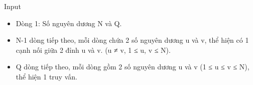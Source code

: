 Input
\begin{itemize}
	\item      Dòng 1: Số nguyên dương N và Q.    
	\item      N-1 dòng tiếp theo, mỗi dòng chứa 2 số nguyên dương u và v, thể hiện có 1 cạnh nối giữa 2 đỉnh u và v. (u ≠ v, 1 ≤ u, v ≤ N).    
	\item      Q dòng tiếp theo, mỗi dòng gồm 2 số nguyên dương u và v (1 ≤ u ≤ v ≤ N), thể hiện 1 truy vấn.    
\end{itemize}